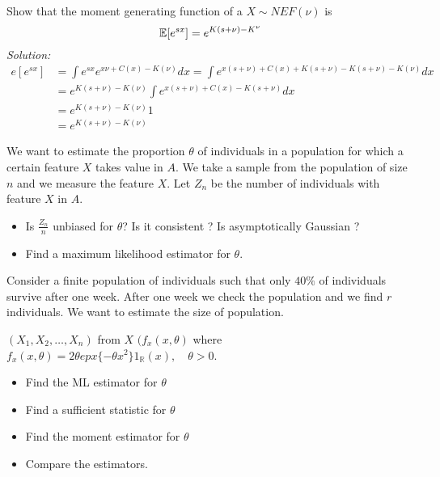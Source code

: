 \begin{ex}
	Show that the moment generating function of a \rv $X\sim NEF(\nu)$ is
	$$\mathbb{E}[e^{sx}]=e^{K(s+\nu)-K^\nu}$$
\textit{Solution:}
\[
\begin{split}
e[e^{sx}]
&=\int e^{sx}e^{x\nu+C(x)-K(\nu)}dx=\int e^{x(s+\nu)+C(x)+K(s+\nu)-K(s+\nu)-K(\nu)}dx\\
&=e^{K(s+\nu)-K(\nu)}\int e^{x(s+\nu)+C(x)-K(s+\nu)}dx\\
&=e^{K(s+\nu)-K(\nu)} 1\\
&=e^{K(s+\nu)-K(\nu)}
	\end{split}
	\]
\end{ex}



\begin{ex}
	We want to estimate the proportion $\theta$ of individuals in a population for which a certain feature $X$ takes value in $A$. We take a sample from the population of size $n$ and we measure the feature $X$. Let $Z_n$ be the number of individuals with feature $X$ in $A$. 
	\begin{itemize}
		\item
		Is $\frac{Z_n}{n}$ unbiased for $\theta$? Is it consistent ? Is asymptotically Gaussian ?
		\item
		Find a maximum likelihood estimator for $\theta$. 
	\end{itemize}
\end{ex}



\begin{ex}
	Consider a finite population of individuals such that only $40\%$ of individuals survive after one week. After one week we check the population and we find $r$ individuals. We want to estimate the size of population.
\end{ex}  

\begin{ex}
	$(X_1,X_2,\ldots,X_n)$ from $X$ $(f_x(x,\theta)$ where $f_x(x,\theta)=2\theta epx\{ -\theta x^2\} 1_{\mathbb{R}}(x), \quad \theta > 0$.
	\begin{itemize}
		\item
		Find the ML estimator for $\theta$
		\item
		Find a sufficient statistic for $\theta$
		\item
		Find the moment estimator for $\theta$
		\item
		Compare the estimators.
	\end{itemize}
\end{ex}

